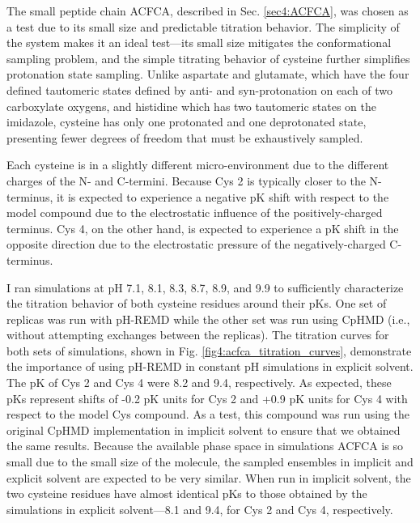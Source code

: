 The small peptide chain ACFCA, described in Sec. \ref{sec4:ACFCA}, was chosen as a
test due to its small size and predictable titration behavior. The simplicity of
the system makes it an ideal test---its small size mitigates the conformational
sampling problem, and the simple titrating behavior of cysteine further
simplifies protonation state sampling. Unlike aspartate and glutamate, which
have the four defined tautomeric states defined by anti- and syn-protonation on
each of two carboxylate oxygens, and histidine which has two tautomeric states
on the imidazole, cysteine has only one protonated and one deprotonated state,
presenting fewer degrees of freedom that must be exhaustively sampled.

Each cysteine is in a slightly different micro-environment due to the different
charges of the N- and C-termini. Because Cys 2 is typically closer to the
N-terminus, it is expected to experience a negative pK shift with respect
to the model compound due to the electrostatic influence of the
positively-charged terminus.  Cys 4, on the other hand, is expected to
experience a pK shift in the opposite direction due to the electrostatic
pressure of the negatively-charged C-terminus.

I ran simulations at pH 7.1, 8.1, 8.3, 8.7, 8.9, and 9.9 to sufficiently
characterize the titration behavior of both cysteine residues around their
pKs. One set of replicas was run with pH-REMD while the other set was run
using CpHMD (i.e., without attempting exchanges between the replicas). The
titration curves for both sets of simulations, shown in
Fig. \ref{fig4:acfca_titration_curves}, demonstrate the importance of using
pH-REMD in constant pH simulations in explicit solvent. The pK of Cys 2
and Cys 4 were 8.2 and 9.4, respectively. As expected, these pKs
represent shifts of -0.2 pK units for Cys 2 and +0.9 pK units for Cys 4 with
respect to the model Cys compound. As a test, this compound was run using the
original CpHMD implementation in implicit solvent
\cite{Mongan_JComputChem_2004_v25_p2038} to ensure that we obtained the same
results. Because the available phase space in simulations ACFCA is so small due
to the small size of the molecule, the sampled ensembles in implicit and
explicit solvent are expected to be very similar. When run in implicit solvent,
the two cysteine residues have almost identical pKs to those obtained by
the simulations in explicit solvent---8.1 and 9.4, for Cys 2 and Cys 4,
respectively.

